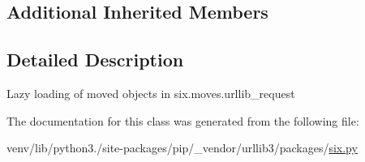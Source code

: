 \subsection*{Additional Inherited Members}


\subsection{Detailed Description}
\begin{DoxyVerb}Lazy loading of moved objects in six.moves.urllib_request\end{DoxyVerb}
 

The documentation for this class was generated from the following file\+:\begin{DoxyCompactItemize}
\item 
venv/lib/python3./site-\/packages/pip/\+\_\+vendor/urllib3/packages/\hyperlink{pip_2__vendor_2urllib3_2packages_2six_8py}{six.\+py}\end{DoxyCompactItemize}

